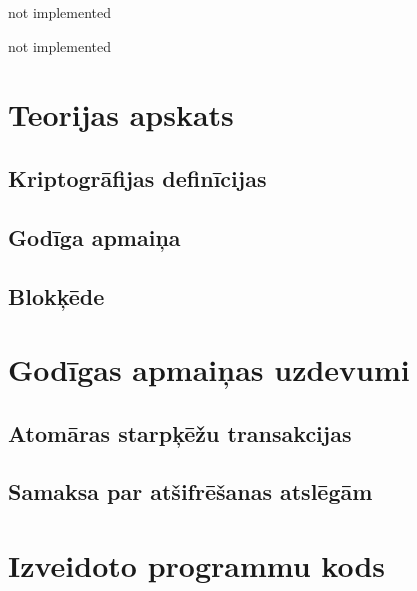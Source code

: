 \documentclass[singlespacing, latexmargins]{ludis}
\begin{document}
\maketitle

\begin{abstract-lv}
    not implemented

\end{abstract-lv}

\begin{abstract-en}
    not implemented

\end{abstract-en}

\tableofcontents





\chapter{Teorijas apskats}


\section{Kriptogrāfijas definīcijas}


\section{Godīga apmaiņa}


\section{Blokķēde}


\chapter{Godīgas apmaiņas uzdevumi}


\section{Atomāras starpķēžu transakcijas}


\section{Samaksa par atšifrēšanas atslēgām}









\appendix
\chapter{Izveidoto programmu kods}

% 
\end{document}
